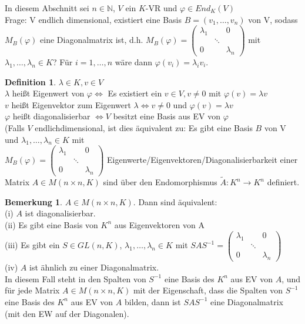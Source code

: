 \documentclass[10pt,a4paper,numbers=endperiod]{scrartcl}
\theoremstyle{definition}
\newtheorem{defi}[satz]{Definition}
\newtheorem{bem}[satz]{Bemerkung}
\def\NN{{\mathbb N}}
\begin{document}
\onehalfspacing
In diesem Abschnitt sei $n \in \NN$, $V$ ein $K$-VR und $\varphi \in End_K(V)$\\
Frage: V endlich dimensional, existiert eine Basis $B = (v_1, \ldots, v_n)$ von V, sodass $M_B(\varphi)$ eine Diagonalmatrix ist, d.h. $M_B(\varphi) = \begin{pmatrix}
\lambda_1&&0\\
&\ddots&\\
0&&\lambda_n
\end{pmatrix}$ mit $\lambda_1,\ldots, \lambda_n \in K$? Für $i= 1,\ldots,n$ wäre dann $\varphi(v_i) = \lambda_iv_i$.\\

\begin{defi}
	$\lambda \in K, v\in V$\\
	$\lambda$ heißt Eigenwert von $\varphi \Leftrightarrow$ Es existiert ein $v \in V, v \neq 0$ mit $\varphi(v) = \lambda v$\\
	$v$ heißt Eigenvektor zum Eigenwert $\lambda \Leftrightarrow v \neq 0$ und $\varphi (v) = \lambda v$\\
	$\varphi$ heißt diagonalisierbar $\Leftrightarrow V$ besitzt eine Basis aus EV von $\varphi$\\
	(Falls $V$ endlichdimensional, ist dies äquivalent zu: Es gibt eine Basis $B$ von V und $\lambda_1, \ldots, \lambda_n \in K$ mit\\ $M_B(\varphi) = \begin{pmatrix}
	\lambda_1&&0\\
	&\ddots&\\
	0&&\lambda_n
	\end{pmatrix}$
	Eigenwerte/Eigenvektoren/Diagonalisierbarkeit einer Matrix $A \in M(n \times n, K)$ sind über den Endomorphismus $\tilde{A}: K^n \rightarrow K^n$ definiert.
\end{defi}

\begin{bem}
	$A \in M(n \times n, K)$. Dann sind äquivalent:\\
	(i) $A$ ist diagonalisierbar.\\
	(ii) Es gibt eine Basis von $K^n$ aus Eigenvektoren von A\\
	(iii) Es gibt ein $S \in GL(n,K)$, $\lambda_1, \ldots, \lambda_n \in K$ mit $SAS^{-1} = \begin{pmatrix}
	\lambda_1&&0\\
	&\ddots&\\
	0&&\lambda_n
	\end{pmatrix}$\\
	(iv) $A$ ist ähnlich zu einer Diagonalmatrix.\\
	In diesem Fall steht in den Spalten von $S^{-1}$ eine Basis des $K^n$ aus EV von $A$, und für jede Matrix $A \in M(n\times n, K)$ mit der Eigenschaft, dass die Spalten von $S^{-1}$ eine Basis des $K^n$ aus EV von $A$ bilden, dann ist $SAS^{-1}$ eine Diagonalmatrix (mit den EW auf der Diagonalen).
\end{bem}
\end{document}
